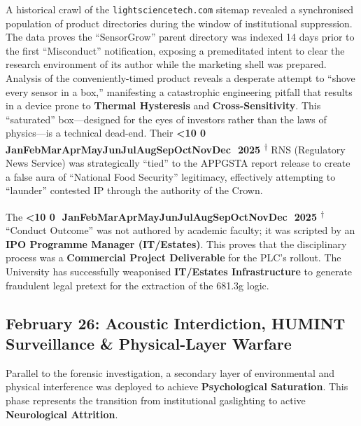 \documentclass{EMBASSY}
\DeclareRobustCommand{\gmt}[3]{%
    \texorpdfstring{%
        {\color{DateGold}\textbf{%
            \ifnum#1<10 0\fi#1\,\textperiodcentered\,%
            \ifcase#2\or Jan\or Feb\or Mar\or Apr\or May\or Jun\or Jul\or Aug\or Sep\or Oct\or Nov\or Dec\fi
            \,\textperiodcentered\,20#3%
            \textsuperscript{$\dagger$}%
        }}%
    }{%
        (#1/#2/#3)%
    }%
}
\begin{document}
A historical crawl of the \texttt{lightsciencetech.com} sitemap revealed a synchronised population of product directories during the window of institutional suppression. The data proves the ``SensorGrow'' parent directory was indexed 14 days prior to the first ``Misconduct'' notification, exposing a premeditated intent to clear the research environment of its author while the marketing shell was prepared. Analysis of the conveniently-timed product reveals a desperate attempt to ``shove every sensor in a box,'' manifesting a catastrophic engineering pitfall that results in a device prone to \textbf{Thermal Hysteresis} and \textbf{Cross-Sensitivity}. This ``saturated'' box---designed for the eyes of investors rather than the laws of physics---is a technical dead-end. Their \gmt{3}{11}{25} RNS (Regulatory News Service) was strategically ``tied'' to the APPGSTA report release to create a false aura of ``National Food Security'' legitimacy, effectively attempting to ``launder'' contested IP through the authority of the Crown.

The \gmt{8}{12}{25} ``Conduct Outcome'' was not authored by academic faculty; it was scripted by an \textbf{IPO Programme Manager (IT/Estates)}. This proves that the disciplinary process was a \textbf{Commercial Project Deliverable} for the PLC’s rollout. The University has successfully weaponised \textbf{IT/Estates Infrastructure} to generate fraudulent legal pretext for the extraction of the 681.3g logic.

\subsection{February 26: Acoustic Interdiction, HUMINT Surveillance \& Physical-Layer Warfare}
Parallel to the forensic investigation, a secondary layer of environmental and physical interference was deployed to achieve \textbf{Psychological Saturation}. This phase represents the transition from institutional gaslighting to active \textbf{Neurological Attrition}.
\end{document}
